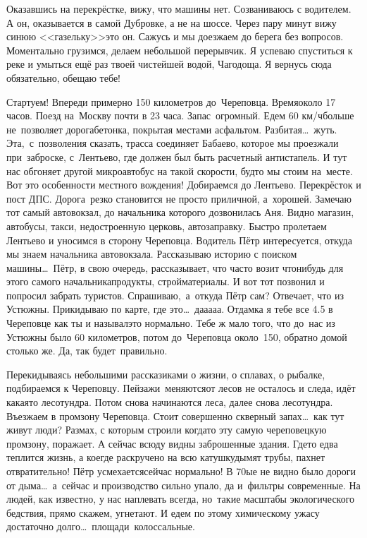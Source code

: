 Оказавшись на перекрёстке, вижу, что машины нет. Созваниваюсь с водителем. А он, оказывается в самой Дубровке, а не на шоссе. Через пару минут вижу синюю <<газельку>>\mdash это он. Сажусь и мы доезжаем до берега без вопросов. Моментально грузимся, делаем небольшой перерывчик. Я успеваю спуститься к реке и умыться ещё раз твоей чистейшей водой, Чагодоща. Я вернусь сюда обязательно, обещаю тебе!

Стартуем! Впереди примерно 150 километров до~Череповца. Время\mdash около 17 часов. Поезд на~Москву почти в 23 часа. Запас~огромный. Едем 60 км/ч\mdash больше не~позволяет дорога\mdash бетонка, покрытая местами асфальтом. Разбитая\ldots~жуть. Эта,~с~позволения сказать, трасса соединяет Бабаево, которое мы проезжали при~заброске, с~Лентьево, где должен был быть расчетный антистапель. И тут нас обгоняет другой микроавтобус на такой скорости, будто мы стоим на~месте. Вот это особенности местного вождения! 
\newpage
Добираемся до Лентьево. Перекрёсток и пост ДПС. Дорога~резко становится не просто приличной, а~хорошей. Замечаю тот самый автовокзал, до начальника которого дозвонилась Аня. Видно магазин, автобусы, такси, недостроенную церковь, автозаправку. Быстро пролетаем Лентьево и уносимся в сторону Череповца. Водитель Пётр интересуется, откуда мы знаем начальника автовокзала. Рассказываю историю с поиском машины\ldots~Пётр, в свою очередь, рассказывает, что часто возит что\sdash нибудь для этого самого начальника\mdash продукты, стройматериалы. И вот тот позвонил и попросил забрать туристов. Спрашиваю,~а~откуда Пётр сам? Отвечает, что из Устюжны. Прикидываю по карте, где это\ldots~да\sdash а\sdash а\sdash а\sdash а. Отдам\sdash ка я тебе все 4.5 в Череповце как ты и называл\mdash это нормально. Тебе ж мало того, что до~нас из Устюжны было 60 километров, потом до~Череповца около~150, обратно домой столько же. Да, так будет~правильно. 

Перекидываясь небольшими рассказиками о жизни, о сплавах, о рыбалке, подбираемся к Череповцу. Пейзажи~меняются\mdash от лесов не осталось и следа, идёт какая\sdash то лесотундра. Потом снова начинаются леса, далее снова лесотундра. Въезжаем в промзону Череповца. Стоит совершенно скверный запах\ldots~как тут живут люди? Размах, с которым строили когда\sdash то эту самую череповецкую промзону, поражает. А сейчас всюду видны заброшенные здания. Где\sdash то едва теплится жизнь, а кое\sdash где раскручено на всю катушку\mdash дымят трубы, пахнет отвратительно! Пётр усмехается\mdash сейчас нормально! В 70\sdash ые не видно было дороги от дыма\ldots~а~сейчас и производство сильно упало, да и~фильтры современные. На людей, как известно, у нас наплевать всегда, но~такие масштабы экологического бедствия, прямо скажем, угнетают. И едем по этому химическому ужасу достаточно долго\ldots~площади~колоссальные.

